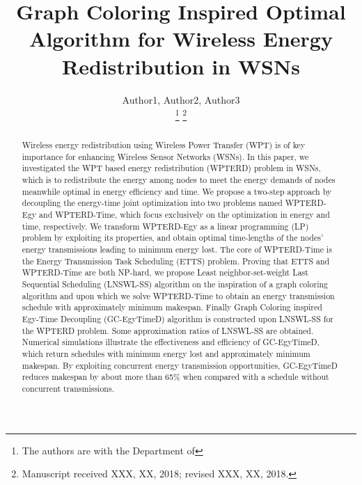 \documentclass[journal,10pt]{IEEEtran}
\begin{document}
\title{Graph Coloring Inspired Optimal Algorithm for Wireless Energy Redistribution in WSNs}


\author{Author1, Author2, Author3

\thanks{The authors are with the Department of }%
\thanks{Manuscript received XXX, XX, 2018; revised XXX, XX, 2018.}}

{}


\maketitle


\begin{abstract}
Wireless energy redistribution using Wireless Power Transfer (WPT) is of key importance for enhancing Wireless Sensor Networks (WSNs). In this paper, we investigated the WPT based energy redistribution (WPTERD) problem in WSNs, which is to redistribute the energy among nodes to meet the energy demands of nodes meanwhile optimal in energy efficiency and time. We propose a two-step approach by decoupling the energy-time joint optimization into two problems named WPTERD-Egy and WPTERD-Time, which focus exclusively on the optimization in energy and time, respectively. We transform WPTERD-Egy as a linear programming (LP) problem by exploiting its properties, and obtain optimal time-lengths of the nodes' energy transmissions leading to minimum energy lost. The core of WPTERD-Time is the Energy Transmission Task Scheduling (ETTS) problem. Proving that ETTS and WPTERD-Time are both NP-hard, we propose Least neighbor-set-weight Last Sequential Scheduling (LNSWL-SS) algorithm on the inspiration of a graph coloring algorithm and upon which we solve WPTERD-Time to obtain an energy transmission schedule with approximately minimum makespan. Finally Graph Coloring inspired Egy-Time Decoupling (GC-EgyTimeD) algorithm is constructed upon LNSWL-SS for the WPTERD problem. Some approximation ratios of LNSWL-SS are obtained. Numerical simulations illustrate the effectiveness and efficiency of GC-EgyTimeD, which return schedules with minimum energy lost and approximately minimum makespan. By exploiting concurrent energy transmission opportunities, GC-EgyTimeD reduces makespan by about more than 65\% when compared with a schedule without concurrent transmissions.

\end{abstract}
\end{document}
